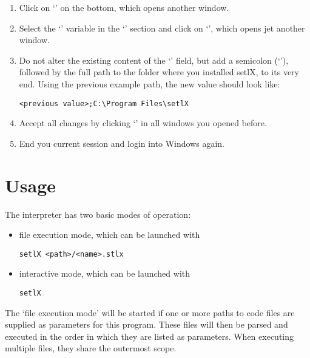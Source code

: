 \begin{enumerate}
\begin{enumerate}
\begin{itemize}
		\end{itemize}
		\item Click on `' on the bottom, which opens another window.
		\item Select the `' variable in the `' section and click on `', which opens jet another window.
		\item Do not alter the existing content of the `' field, but add a semicolon (`\command{;}'), followed by the full path to the folder where you installed setlX, to its very end. Using the previous example path, the new value should look like:
\begin{lstlisting}[frame=none,numbers=none]
<previous value>;C:\Program Files\setlX
\end{lstlisting}
		\item Accept all changes by clicking `' in all windows you opened before.
		\item End you current session and login into Windows again.
	\end{enumerate}
\end{enumerate}

\newpage

\section{Usage}

The \setlX{} interpreter has two basic modes of operation:

\begin{itemize}
	\item file execution mode, which can be launched with
\begin{lstlisting}[frame=none,numbers=none]
setlX <path>/<name>.stlx
\end{lstlisting}
	\item interactive mode, which can be launched with
\begin{lstlisting}[frame=none,numbers=none]
setlX
\end{lstlisting}
\end{itemize}

The `file execution mode' will be started if one or more paths to code files are supplied as parameters for this program. These files will then be parsed and executed in the order in which they are listed as parameters. When executing multiple files, they share the outermost scope.

